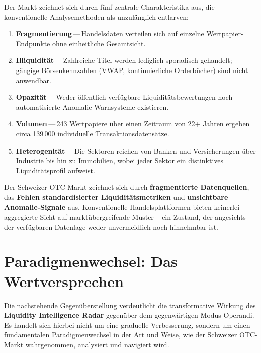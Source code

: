 \documentclass[11pt, a4paper, oneside, openany]{report}
\newcommand{\term}[1]{\textcolor{SwissRed}{\textsf{\textbf{#1}}}}
\begin{document}
Der Markt zeichnet sich durch fünf zentrale Charakteristika aus, die konventionelle Analysemethoden als unzulänglich entlarven:

\begin{enumerate}[label=\textcolor{SwissRed}{\textbf{\arabic*.}}]
  \item \textbf{Fragmentierung}\,---\,Handelsdaten verteilen sich auf einzelne Wertpapier-Endpunkte ohne einheitliche Gesamtsicht.
  \item \textbf{Illiquidität}\,---\,Zahlreiche Titel werden lediglich sporadisch gehandelt; gängige Börsenkennzahlen (VWAP, kontinuierliche Orderbücher) sind nicht anwendbar.
  \item \textbf{Opazität}\,---\,Weder öffentlich verfügbare Liquiditätsbewertungen noch automatisierte Anomalie-Warnsysteme existieren.
  \item \textbf{Volumen}\,---\,243 Wertpapiere über einen Zeitraum von 22+ Jahren ergeben circa 139\,000 individuelle Transaktionsdatensätze.
  \item \textbf{Heterogenität}\,---\,Die Sektoren reichen von Banken und Versicherungen über Industrie bis hin zu Immobilien, wobei jeder Sektor ein distinktives Liquiditätsprofil aufweist.
\end{enumerate}

\begin{infobox}[Problemstellung]
Der Schweizer OTC-Markt zeichnet sich durch \textbf{fragmentierte Datenquellen}, das \textbf{Fehlen standardisierter Liquiditätsmetriken} und \textbf{unsichtbare Anomalie-Signale} aus. Konventionelle Handelsplattformen bieten keinerlei aggregierte Sicht auf marktübergreifende Muster -- ein Zustand, der angesichts der verfügbaren Datenlage weder unvermeidlich noch hinnehmbar ist.
\end{infobox}

\section{Paradigmenwechsel: Das Wertversprechen}
\label{sec:paradigmenwechsel}

Die nachstehende Gegenüberstellung verdeutlicht die transformative Wirkung des \term{Liquidity Intelligence Radar} gegenüber dem gegenwärtigen Modus Operandi. Es handelt sich hierbei nicht um eine graduelle Verbesserung, sondern um einen fundamentalen Paradigmenwechsel in der Art und Weise, wie der Schweizer OTC-Markt wahrgenommen, analysiert und navigiert wird.
\end{document}
